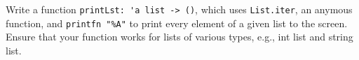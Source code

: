 Write a function \mbox{\lstinline{printLst: 'a list -> ()}}, which uses \lstinline{List.iter}, an anymous function, and \lstinline{printfn "%A"} to print every element of a given list to the screen. Ensure that your function works for lists of various types, e.g., int list and string list.
